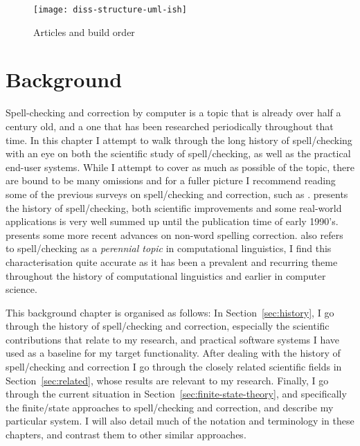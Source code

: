 \documentclass[officiallayout]{unihelcompling}
\begin{document}
\begin{figure}
    \texttt{[image: diss-structure-uml-ish]}
    \caption{Articles and build order
    \label{fig:schematic-diagram}}
\end{figure}

\chapter{Background}
\label{chap:background}

Spell-checking and correction by computer is a topic that is already over half
a century old, and a one that has been researched periodically throughout that
time.  In this chapter I attempt to walk through the long history of
spell\-/checking with an eye on both the scientific study of spell\-/checking,
as well as the practical end-user systems. While I attempt to cover as
much as possible of the topic, there are bound to be many omissions and for
a fuller picture I recommend reading some of the previous surveys on
spell\-/checking and correction, such as
\citet{kukich1992spelling,mitton2009ordering}.  \citet{kukich1992spelling}
presents
the history of spell\-/checking, both scientific improvements and some
real-world applications is very well summed up until the publication time of
early 1990's.  \citet{mitton2009ordering} presents some more recent advances on
non-word spelling correction.  \citet{kukich1992spelling} also refers to
spell\-/checking as a \emph{perennial topic} in computational linguistics, I
find this characterisation quite accurate as it has been a prevalent and
recurring theme throughout the history of computational linguistics and earlier
in computer science.


This background chapter is organised as follows: In
Section~\ref{sec:history}, I go through the history of spell\-/checking and
correction, especially the scientific contributions that relate to my research,
and practical software systems I have used as a baseline for my target
functionality.  After dealing with the history of spell\-/checking and
correction I go through the closely related scientific fields in
Section~\ref{sec:related}, whose results are relevant to my research. Finally,
I go through the current situation in Section~\ref{sec:finite-state-theory},
and specifically the finite\-/state approaches to spell\-/checking and
correction, and describe my particular system. I will also detail much of the
notation and terminology in these chapters, and contrast them to other similar
approaches.
\end{document}
